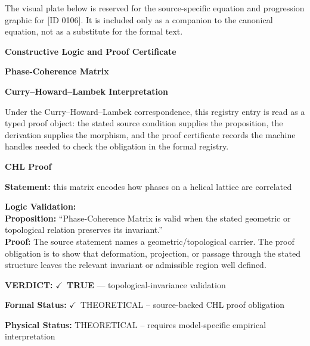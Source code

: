 \begingroup\footnotesize\sloppy
The visual plate below is reserved for the source-specific equation and progression graphic for [ID 0106]. It is included only as a companion to the canonical equation, not as a substitute for the formal text.
\par\endgroup
\ifTZPDarkEdition
{}
\fi

\clearpage
\begingroup\tzpsupportsetup
\noindent\textbf{\fontsize{10.8pt}{12.8pt}\selectfont [ID 0106] Constructive Logic and Proof Certificate}\par
\noindent\textbf{\fontsize{10pt}{12pt}\selectfont Phase-Coherence Matrix}\par
\vspace{0.45em}
\begingroup
\footnotesize
\setlength{\parskip}{0.22em}
\setlength{\parindent}{0pt}
\noindent\textbf{Curry--Howard--Lambek Interpretation}\par
Under the Curry--Howard--Lambek correspondence, this registry entry is read as a typed proof
object: the stated source condition supplies the proposition, the derivation supplies the
morphism, and the proof certificate records the machine handles needed to check the obligation
in the formal registry.

\vspace{0.45em}
\noindent\textbf{CHL Proof}\par
\textbf{Statement:} this matrix encodes how phases on a helical lattice are correlated

\textbf{Logic Validation:}\\
\textbf{Proposition:} ``Phase-Coherence Matrix is valid when the stated geometric or topological relation
preserves its invariant.''\\
\textbf{Proof:} The source statement names a geometric/topological carrier. The proof obligation is to
show that deformation, projection, or passage through the stated structure leaves the
relevant invariant or admissible region well defined.

\textbf{VERDICT:} \ensuremath{\checkmark}\ \textbf{TRUE} --- topological-invariance validation

\textbf{Formal Status:} \ensuremath{\checkmark}\ THEORETICAL -- source-backed CHL proof obligation

\textbf{Physical Status:} THEORETICAL -- requires model-specific empirical interpretation
\par\vspace{0.45em}
\par
\ifTZPDarkEdition
{}
\fi
\endgroup
\endgroup
